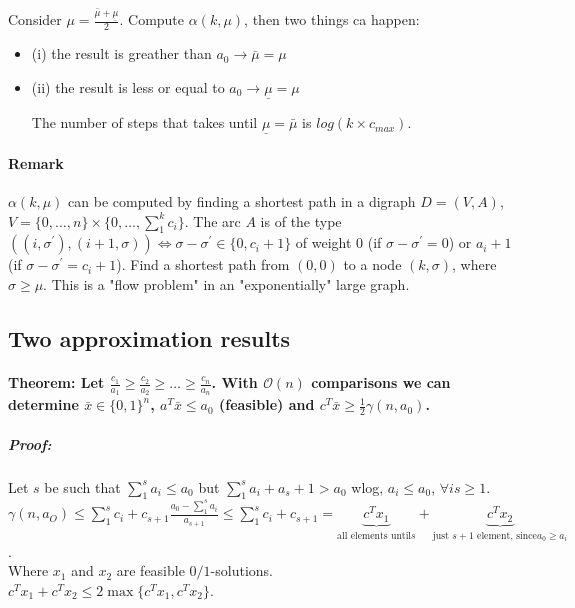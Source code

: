 \documentclass[main]{subfiles}
\begin{document}
Consider $\mu = \frac{\bar{\mu} + \underline{\mu}}{2}$. Compute
$\alpha(k, \mu)$, then two things ca happen:
\begin{itemize}
\item (i) the result is greather than $a_{0} \rightarrow \bar{\mu} = \mu$
\item (ii) the result is less or equal to $a_{0} \rightarrow \underline{\mu} =
\mu$

The number of steps that takes until $\underline{\mu} = \bar{\mu}$ is $log(k
\times c_{max})$.
\end{itemize}

\paragraph{Remark}
$\alpha(k, \mu)$ can be computed by finding a shortest path in a digraph
$D=(V,A)$, $V =\{0, \dots, n\} \times \{0, \dots, \sum_1^k c_i\}$. The arc $A$
is of the type $((i, \sigma^\prime), (i+1, \sigma)) \iff \sigma - \sigma^\prime
\in \{0, c_i + 1\}$ of weight $0$ (if $\sigma - \sigma^\prime = 0$) or
$a_i + 1$ (if $\sigma - \sigma^\prime = c_i +1$). Find a shortest path from
$(0,0)$ to a node $(k, \sigma)$, where $\sigma \geq \mu$. This is a "flow
problem" in an "exponentially" large graph.


\subsection{Two approximation results}

\paragraph{Theorem: Let $\frac{c_1}{a_1} \geq \frac{c_2}{a_2}\geq \dots \geq
\frac{c_n}{a_n}$. With $\mathcal{O}(n)$ comparisons we can determine $\bar{x}
\in \{0,1\}^n$, $a^T \bar{x} \leq a_0$ (feasible) and $c^T \bar{x} \geq
\frac{1}{2} \gamma (n, a_0)$. }

\subparagraph{Proof:}
Let $s$ be such that $\sum_1^s a_i \leq a_0$ but $\sum_1^s a_i + a_s + 1 > a_0$
wlog, $a_i \leq a_0$, $\forall i s \geq 1$.\\
$\gamma (n, a_O) \leq \sum_1^s c_i + c_{s+1} \frac{a_0 - \sum_1^s a_i}{a_{s+1}}
\leq \sum_1^s c_i + c_{s+1} = \underbrace{c^T x_1}_{\text{all elements until
$s$}} + \underbrace{c^T x_2}_{\text{just $s+1$ element, since
$a_0 \geq a_i$}}$.\\
Where $x_1$ and $x_2$ are feasible $0/1$-solutions.\\
$c^T x_1 + c^T x_2 \leq 2 \max \{c^T x_1, c^T x_2\}$.
\end{document}
